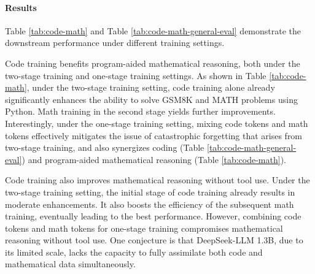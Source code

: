 \paragraph{Results}
Table \ref{tab:code-math} and Table \ref{tab:code-math-general-eval} demonstrate the downstream performance under different training settings.

Code training benefits program-aided mathematical reasoning, both under the two-stage training and one-stage training settings.
As shown in Table \ref{tab:code-math}, under the two-stage training setting, code training alone already significantly enhances the ability to solve GSM8K and MATH problems using Python.
Math training in the second stage yields further improvements.
Interestingly, under the one-stage training setting, mixing code tokens and math tokens effectively mitigates the issue of catastrophic forgetting that arises from two-stage training, and also synergizes coding (Table \ref{tab:code-math-general-eval}) and program-aided mathematical reasoning (Table \ref{tab:code-math}).

Code training also improves mathematical reasoning without tool use.
Under the two-stage training setting, the initial stage of code training already results in moderate enhancements.
It also boosts the efficiency of the subsequent math training, eventually leading to the best performance.
However, combining code tokens and math tokens for one-stage training compromises mathematical reasoning without tool use.
One conjecture is that DeepSeek-LLM 1.3B, due to its limited scale, lacks the capacity to fully assimilate both code and mathematical data simultaneously.


